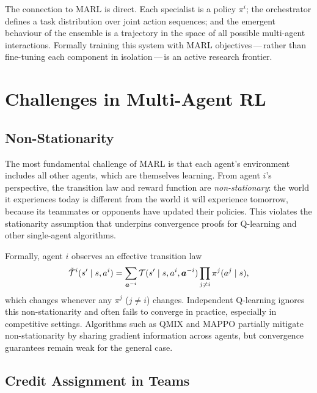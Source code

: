 The connection to MARL is direct. Each specialist is a policy
$\pi^i$; the orchestrator defines a task distribution over joint
action sequences; and the emergent behaviour of the ensemble is a
trajectory in the space of all possible multi-agent interactions.
Formally training this system with MARL objectives\,---\,rather than
fine-tuning each component in isolation\,---\,is an active research
frontier.

\section{Challenges in Multi-Agent RL}
\label{sec:marl-challenges}

\subsection{Non-Stationarity}

The most fundamental challenge of MARL is that each agent's
environment includes all other agents, which are themselves
learning. From agent $i$'s perspective, the transition law and
reward function are \emph{non-stationary}:
the world it experiences today is different from the world it will
experience tomorrow, because its teammates or opponents have updated
their policies. This violates the stationarity assumption that
underpins convergence proofs for Q-learning and other single-agent
algorithms.

Formally, agent $i$ observes an effective transition law
\[
  \tilde{\mathcal{T}}^i(s' \mid s, a^i)
  = \sum_{\bm{a}^{-i}} \mathcal{T}(s' \mid s, a^i, \bm{a}^{-i})
    \prod_{j \neq i} \pi^j(a^j \mid s),
\]
which changes whenever any $\pi^j$ ($j \neq i$) changes. Independent
Q-learning ignores this non-stationarity
and often fails to converge in practice, especially in competitive
settings. Algorithms such as QMIX and MAPPO partially mitigate
non-stationarity by sharing gradient information across agents, but
convergence guarantees remain weak for the general case.

\subsection{Credit Assignment in Teams}

